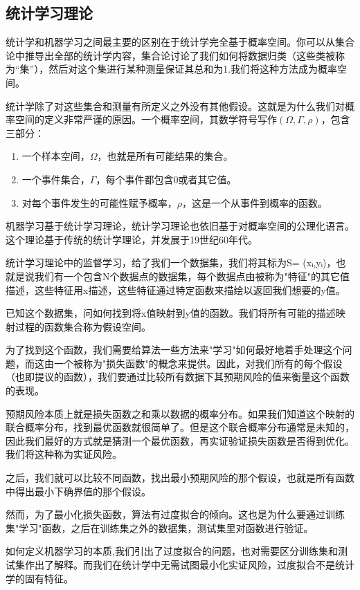 \subsection{统计学习理论}

统计学和机器学习之间最主要的区别在于统计学完全基于概率空间。你可以从集合论中推导出全部的统计学内容，集合论讨论了我们如何将数据归类（这些类被称为“集”），然后对这个集进行某种测量保证其总和为1.我们将这种方法成为概率空间。

统计学除了对这些集合和测量有所定义之外没有其他假设。这就是为什么我们对概率空间的定义非常严谨的原因。一个概率空间，其数学符号写作$(\Omega,\Gamma,\rho)$，包含三部分：

\begin{enumerate}
	\item 一个样本空间，$\Omega$，也就是所有可能结果的集合。
	\item 一个事件集合，$\Gamma$，每个事件都包含0或者其它值。
	\item 对每个事件发生的可能性赋予概率，$\rho$，这是一个从事件到概率的函数。
\end{enumerate}

机器学习基于统计学习理论，统计学习理论也依旧基于对概率空间的公理化语言。这个理论基于传统的统计学理论，并发展于19世纪60年代。

统计学习理论中的监督学习，给了我们一个数据集，我们将其标为S= {(xᵢ,yᵢ)}，也就是说我们有一个包含N个数据点的数据集，每个数据点由被称为"特征"的其它值描述，这些特征用x描述，这些特征通过特定函数来描绘以返回我们想要的y值。

已知这个数据集，问如何找到将x值映射到y值的函数。我们将所有可能的描述映射过程的函数集合称为假设空间。

为了找到这个函数，我们需要给算法一些方法来"学习"如何最好地着手处理这个问题，而这由一个被称为"损失函数"的概念来提供。因此，对我们所有的每个假设（也即提议的函数），我们要通过比较所有数据下其预期风险的值来衡量这个函数的表现。

预期风险本质上就是损失函数之和乘以数据的概率分布。如果我们知道这个映射的联合概率分布，找到最优函数就很简单了。但是这个联合概率分布通常是未知的，因此我们最好的方式就是猜测一个最优函数，再实证验证损失函数是否得到优化。我们将这种称为实证风险。

之后，我们就可以比较不同函数，找出最小预期风险的那个假设，也就是所有函数中得出最小下确界值的那个假设。

然而，为了最小化损失函数，算法有过度拟合的倾向。这也是为什么要通过训练集"学习"函数，之后在训练集之外的数据集，测试集里对函数进行验证。

如何定义机器学习的本质,我们引出了过度拟合的问题，也对需要区分训练集和测试集作出了解释。而我们在统计学中无需试图最小化实证风险，过度拟合不是统计学的固有特征。

